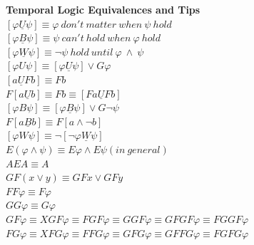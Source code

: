 \documentclass{article}
\begin{document}
\begin{multicols}{4}
\textbf{Temporal Logic Equivalences and Tips} \\
$[\varphi \underline{U} \psi] \equiv \varphi\ don't\ matter\ when\ \psi\ hold $ \\
$[\varphi \underline{B} \psi] \equiv \psi\ can't\ hold\ when\ \varphi\ hold $ \\
$[\varphi \underline{W} \psi] \equiv \neg\psi\ hold\ until\ \varphi\ \wedge\ \psi $ \\
$[\varphi U \psi] \equiv [\varphi \underline{U} \psi] \vee G\varphi$ \\
$[a \underline{U} Fb] \equiv Fb $ \\
$F[a \underline{U} b] \equiv Fb \equiv [Fa \underline{U} Fb] $ \\
$[\varphi B \psi] \equiv [\varphi \underline{B} \psi] \vee G\neg\psi$ \\
$F[a \underline{B} b] \equiv F[a \wedge \neg b] $ \\
$[\varphi W \psi] \equiv \neg[\neg\varphi \underline{W} \psi]$ \\
$E(\varphi \wedge \psi) \equiv E\varphi \wedge E \psi (in\ general) $ \\
$AEA \equiv A $ \\
$GF(x \vee y) \equiv GFx \vee GFy $ \\
$FF\varphi \equiv F\varphi$\\
$GG\varphi \equiv G\varphi$\\
$GF\varphi \equiv XGF\varphi\equiv FGF\varphi \equiv GGF\varphi\equiv GFGF\varphi \equiv FGGF\varphi$\\
$FG\varphi\equiv XFG\varphi \equiv FFG\varphi \equiv GFG\varphi \equiv GFFG\varphi \equiv FGFG\varphi$ \\


\end{multicols}
\end{document}
